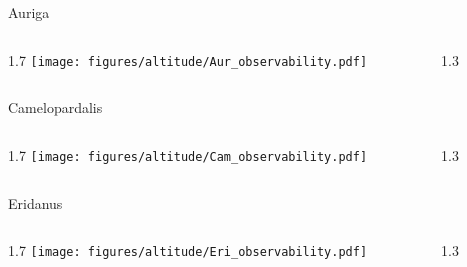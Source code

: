 \documentclass[final]{beamer}
\newlength{\colwidth}
\begin{document}
\begin{frame}[t]{}

  \Large{Auriga}
  \begin{columns}[T]
      \begin{column}{1.7\colwidth}
          \centering
          \texttt{[image: figures/altitude/Aur\_observability.pdf]}
      \end{column}
      \begin{column}{1.3\colwidth}
      \Large
      
      \end{column}
  \end{columns}

  \Large{Camelopardalis}
  \begin{columns}[T]
      \begin{column}{1.7\colwidth}
          \centering
          \texttt{[image: figures/altitude/Cam\_observability.pdf]}
      \end{column}
      \begin{column}{1.3\colwidth}
      \Large
      
      \end{column}
  \end{columns}

  \Large{Eridanus}
  \begin{columns}[T]
      \begin{column}{1.7\colwidth}
          \centering
          \texttt{[image: figures/altitude/Eri\_observability.pdf]}
      \end{column}
      \begin{column}{1.3\colwidth}
      \Large
      
      \end{column}
  \end{columns}
\end{frame}

\end{document}
